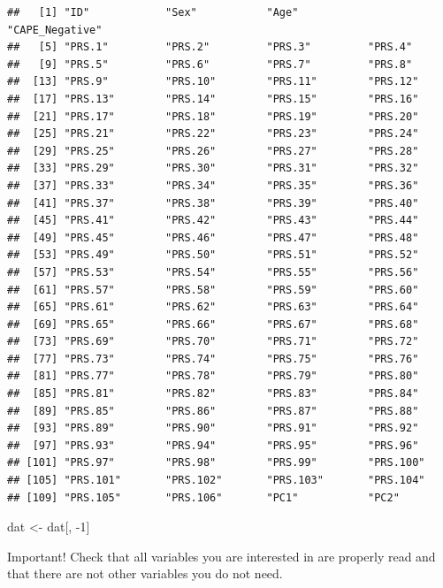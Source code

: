 \documentclass[
]{article}
\newenvironment{Shaded}{\begin{snugshade}}{\end{snugshade}}
\newcommand{\DecValTok}[1]{\textcolor[rgb]{0.00,0.00,0.81}{#1}}
\newcommand{\NormalTok}[1]{#1}
\newcommand{\OtherTok}[1]{\textcolor[rgb]{0.56,0.35,0.01}{#1}}
\newcommand{\SpecialCharTok}[1]{\textcolor[rgb]{0.00,0.00,0.00}{#1}}
\begin{document}
\begin{verbatim}
##   [1] "ID"            "Sex"           "Age"           "CAPE_Negative"
##   [5] "PRS.1"         "PRS.2"         "PRS.3"         "PRS.4"        
##   [9] "PRS.5"         "PRS.6"         "PRS.7"         "PRS.8"        
##  [13] "PRS.9"         "PRS.10"        "PRS.11"        "PRS.12"       
##  [17] "PRS.13"        "PRS.14"        "PRS.15"        "PRS.16"       
##  [21] "PRS.17"        "PRS.18"        "PRS.19"        "PRS.20"       
##  [25] "PRS.21"        "PRS.22"        "PRS.23"        "PRS.24"       
##  [29] "PRS.25"        "PRS.26"        "PRS.27"        "PRS.28"       
##  [33] "PRS.29"        "PRS.30"        "PRS.31"        "PRS.32"       
##  [37] "PRS.33"        "PRS.34"        "PRS.35"        "PRS.36"       
##  [41] "PRS.37"        "PRS.38"        "PRS.39"        "PRS.40"       
##  [45] "PRS.41"        "PRS.42"        "PRS.43"        "PRS.44"       
##  [49] "PRS.45"        "PRS.46"        "PRS.47"        "PRS.48"       
##  [53] "PRS.49"        "PRS.50"        "PRS.51"        "PRS.52"       
##  [57] "PRS.53"        "PRS.54"        "PRS.55"        "PRS.56"       
##  [61] "PRS.57"        "PRS.58"        "PRS.59"        "PRS.60"       
##  [65] "PRS.61"        "PRS.62"        "PRS.63"        "PRS.64"       
##  [69] "PRS.65"        "PRS.66"        "PRS.67"        "PRS.68"       
##  [73] "PRS.69"        "PRS.70"        "PRS.71"        "PRS.72"       
##  [77] "PRS.73"        "PRS.74"        "PRS.75"        "PRS.76"       
##  [81] "PRS.77"        "PRS.78"        "PRS.79"        "PRS.80"       
##  [85] "PRS.81"        "PRS.82"        "PRS.83"        "PRS.84"       
##  [89] "PRS.85"        "PRS.86"        "PRS.87"        "PRS.88"       
##  [93] "PRS.89"        "PRS.90"        "PRS.91"        "PRS.92"       
##  [97] "PRS.93"        "PRS.94"        "PRS.95"        "PRS.96"       
## [101] "PRS.97"        "PRS.98"        "PRS.99"        "PRS.100"      
## [105] "PRS.101"       "PRS.102"       "PRS.103"       "PRS.104"      
## [109] "PRS.105"       "PRS.106"       "PC1"           "PC2"
\end{verbatim}

\begin{Shaded}
\begin{Highlighting}[]
\NormalTok{dat }\OtherTok{\textless{}{-}}\NormalTok{ dat[, }\SpecialCharTok{{-}}\DecValTok{1}\NormalTok{]}
\end{Highlighting}
\end{Shaded}

Important! Check that all variables you are interested in are properly
read and that there are not other variables you do not need.
\end{document}
